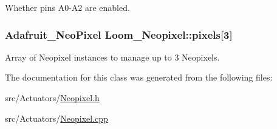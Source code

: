 Whether pins A0-\/\+A2 are enabled. 

\subsubsection[{\texorpdfstring{pixels}{pixels}}]{\setlength{\rightskip}{0pt plus 5cm}Adafruit\+\_\+\+Neo\+Pixel Loom\+\_\+\+Neopixel\+::pixels\mbox{[}3\mbox{]}\hspace{0.3cm}{\ttfamily [protected]}}\hypertarget{class_loom___neopixel_a3f177f651d50d29a0ca12d2a9ba5eb79}{}\label{class_loom___neopixel_a3f177f651d50d29a0ca12d2a9ba5eb79}


Array of Neopixel instances to manage up to 3 Neopixels. 



The documentation for this class was generated from the following files\+:\begin{DoxyCompactItemize}
\item 
src/\+Actuators/\hyperlink{_neopixel_8h}{Neopixel.\+h}\item 
src/\+Actuators/\hyperlink{_neopixel_8cpp}{Neopixel.\+cpp}\end{DoxyCompactItemize}
